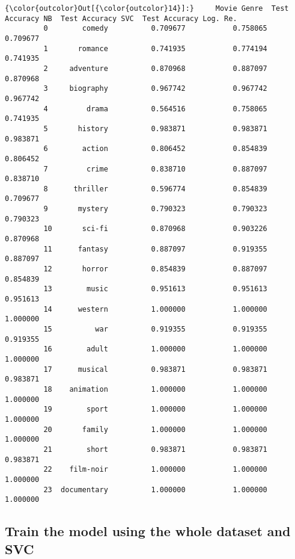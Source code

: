 \documentclass[11pt]{article}
\begin{document}
\begin{Verbatim}[commandchars=\\\{\}]
{\color{outcolor}Out[{\color{outcolor}14}]:}     Movie Genre  Test Accuracy NB  Test Accuracy SVC  Test Accuracy Log. Re.
         0        comedy          0.709677           0.758065                0.709677
         1       romance          0.741935           0.774194                0.741935
         2     adventure          0.870968           0.887097                0.870968
         3     biography          0.967742           0.967742                0.967742
         4         drama          0.564516           0.758065                0.741935
         5       history          0.983871           0.983871                0.983871
         6        action          0.806452           0.854839                0.806452
         7         crime          0.838710           0.887097                0.838710
         8      thriller          0.596774           0.854839                0.709677
         9       mystery          0.790323           0.790323                0.790323
         10       sci-fi          0.870968           0.903226                0.870968
         11      fantasy          0.887097           0.919355                0.887097
         12       horror          0.854839           0.887097                0.854839
         13        music          0.951613           0.951613                0.951613
         14      western          1.000000           1.000000                1.000000
         15          war          0.919355           0.919355                0.919355
         16        adult          1.000000           1.000000                1.000000
         17      musical          0.983871           0.983871                0.983871
         18    animation          1.000000           1.000000                1.000000
         19        sport          1.000000           1.000000                1.000000
         20       family          1.000000           1.000000                1.000000
         21        short          0.983871           0.983871                0.983871
         22    film-noir          1.000000           1.000000                1.000000
         23  documentary          1.000000           1.000000                1.000000
\end{Verbatim}
            
    \hypertarget{train-the-model-using-the-whole-dataset-and-svc}{%
\subsection{Train the model using the whole dataset and
SVC}\label{train-the-model-using-the-whole-dataset-and-svc}}
\end{document}
